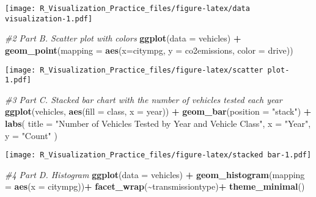 \documentclass[
]{article}
\newenvironment{Shaded}{\begin{snugshade}}{\end{snugshade}}
\newcommand{\AttributeTok}[1]{\textcolor[rgb]{0.13,0.29,0.53}{#1}}
\newcommand{\CommentTok}[1]{\textcolor[rgb]{0.56,0.35,0.01}{\textit{#1}}}
\newcommand{\FunctionTok}[1]{\textcolor[rgb]{0.13,0.29,0.53}{\textbf{#1}}}
\newcommand{\NormalTok}[1]{#1}
\newcommand{\SpecialCharTok}[1]{\textcolor[rgb]{0.81,0.36,0.00}{\textbf{#1}}}
\newcommand{\StringTok}[1]{\textcolor[rgb]{0.31,0.60,0.02}{#1}}
\begin{document}
\texttt{[image: R\_Visualization\_Practice\_files/figure-latex/data visualization-1.pdf]}

\begin{Shaded}
\begin{Highlighting}[]
\CommentTok{\#2 Part B. Scatter plot with colors}
\FunctionTok{ggplot}\NormalTok{(}\AttributeTok{data =}\NormalTok{ vehicles) }\SpecialCharTok{+}
  \FunctionTok{geom\_point}\NormalTok{(}\AttributeTok{mapping =} \FunctionTok{aes}\NormalTok{(}\AttributeTok{x=}\NormalTok{citympg, }\AttributeTok{y =}\NormalTok{ co2emissions, }\AttributeTok{color =}\NormalTok{ drive))}
\end{Highlighting}
\end{Shaded}

\texttt{[image: R\_Visualization\_Practice\_files/figure-latex/scatter plot-1.pdf]}

\begin{Shaded}
\begin{Highlighting}[]
\CommentTok{\#3 Part C. Stacked bar chart with the number of vehicles tested each year}
\FunctionTok{ggplot}\NormalTok{(vehicles, }\FunctionTok{aes}\NormalTok{(}\AttributeTok{fill =}\NormalTok{ class, }\AttributeTok{x =}\NormalTok{ year)) }\SpecialCharTok{+}
  \FunctionTok{geom\_bar}\NormalTok{(}\AttributeTok{position =} \StringTok{"stack"}\NormalTok{) }\SpecialCharTok{+}
  \FunctionTok{labs}\NormalTok{(}
    \AttributeTok{title =} \StringTok{"Number of Vehicles Tested by Year and Vehicle Class"}\NormalTok{,}
    \AttributeTok{x =} \StringTok{"Year"}\NormalTok{,}
    \AttributeTok{y =} \StringTok{"Count"}
\NormalTok{  )}
\end{Highlighting}
\end{Shaded}

\texttt{[image: R\_Visualization\_Practice\_files/figure-latex/stacked bar-1.pdf]}

\begin{Shaded}
\begin{Highlighting}[]
\CommentTok{\#4 Part D. Histogram}
\FunctionTok{ggplot}\NormalTok{(}\AttributeTok{data =}\NormalTok{ vehicles) }\SpecialCharTok{+}
  \FunctionTok{geom\_histogram}\NormalTok{(}\AttributeTok{mapping =} \FunctionTok{aes}\NormalTok{(}\AttributeTok{x =}\NormalTok{ citympg))}\SpecialCharTok{+}
  \FunctionTok{facet\_wrap}\NormalTok{(}\SpecialCharTok{\textasciitilde{}}\NormalTok{transmissiontype)}\SpecialCharTok{+}
  \FunctionTok{theme\_minimal}\NormalTok{()}
\end{Highlighting}
\end{Shaded}
\end{document}
